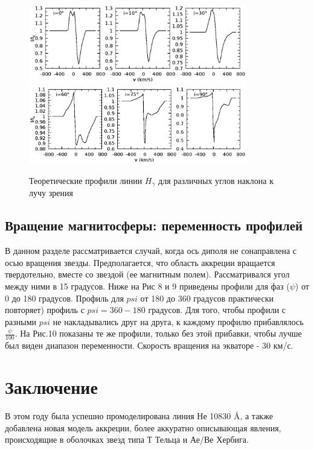 \documentclass{article}
\begin{document}
\begin{figure} [!htb]
    \centering
    \includegraphics[width=0.85\textwidth]{Hg_0_10_30}
    \includegraphics[width=0.85\textwidth]{Hg_60_75_90}
    \caption{Теоретические профили линии $H_\gamma$ для различных углов наклона к лучу зрения}
\end{figure}

\subsection{Вращение магнитосферы: переменность профилей}

В данном разделе рассматривается случай, когда ось диполя не сонаправлена с осью вращения звезды. Предполагается, что область аккреции вращается твердотельно, вместе со звездой (ее магнитным полем). Рассматривался угол между ними в 15 градусов. Ниже на Рис 8 и 9 приведены профили для фаз ($\psi$) от 0 до 180 градусов. Профиль для $psi$ от 180 до 360 градусов практически повторяет) профиль с $psi = 360-180$ градусов. Для того, чтобы профили с разными $psi$ не накладывались друг на друга, к каждому профилю прибавлялось $\frac{\psi}{100}$. На Рис.10 показаны те же профили, только без этой прибавки, чтобы лучше был виден диапазон переменности. Скорость вращения на экваторе - 30 км/с. \\


\section{Заключение}

В этом году была успешно промоделирована линия Не 10830 \AA , а также добавлена новая модель аккреции, более аккуратно описывающая явления, происходящие в оболочках звезд типа Т Тельца и Ае/Ве Хербига.
\end{document}

